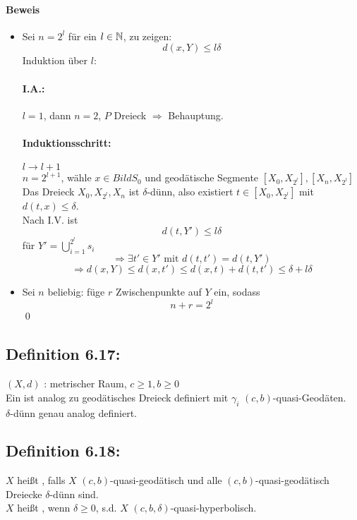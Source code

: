 \documentclass{article}
\begin{document}
\paragraph{Beweis}
\begin{itemize}
	\item Sei $n = 2^l$ für ein $l \in \mathbb{N}$, zu zeigen:
	\[d(x,Y) \leq l\delta \]
	Induktion über $l$:
	\paragraph{I.A.:} $l = 1$, dann $n = 2$, $P$ Dreieck $\Longrightarrow$ Behauptung.
	\paragraph{Induktionsschritt:} $l \rightarrow l + 1$\\
	$n = 2^{l+1}$, wähle $x \in Bild S_0$ und geodätische Segmente $[X_0, X_{2^l}], [X_n, X_{2^l}] $\\
	Das Dreieck $X_0, X_{2^l}, X_n$ ist $\delta$-dünn, also existiert $t \in [X_0, X_{2^l}]$ mit $d(t,x) \leq \delta$.\\
	Nach I.V. ist
	\[d(t, Y') \leq l\delta \]
	für $Y' = \bigcup_{i= 1}^{2^l} s_i$
	\[\Rightarrow \exists t' \in Y' \text{ mit } d(t,t') = d(t,Y') \]
	\[\Rightarrow d(x,Y) \leq d(x,t') \leq d(x,t) + d(t,t') \leq \delta + l \delta \]
	\item Sei $n$ beliebig: füge $r$ Zwischenpunkte auf $Y$ ein, sodass
	\[n + r = 2^l\]
	\qed
\end{itemize}

\subsection{Definition 6.17: }
$(X,d)$ : metrischer Raum, $c \geq 1, b \geq 0$\\
Ein  ist analog zu geodätisches Dreieck definiert mit $\gamma_i$ $(c,b)$-quasi-Geodäten.\\
$\delta$-dünn genau analog definiert.

\subsection{Definition 6.18: }
$X$ heißt , falls $X$ $(c,b)$-quasi-geodätisch und alle $(c,b)$-quasi-geodätisch Dreiecke $\delta$-dünn sind.\\
$X$ heißt , wenn $\delta \geq 0$, s.d. $X$ $(c,b,\delta)$-quasi-hyperbolisch.
\end{document}
